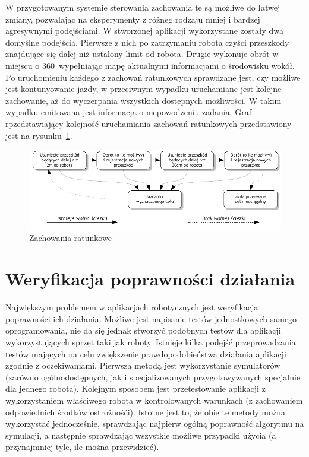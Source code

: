 W przygotowanym systemie sterowania zachowania te są możliwe do łatwej zmiany, pozwalając
na eksperymenty z różneg rodzaju mniej i bardzej agresywnymi podejściami. W stworzonej
aplikacji wykorzystane zostały dwa domyślne podejścia. Pierwsze z nich po zatrzymaniu
robota czyści przeszkody znajdujące się dalej niż ustalony limit od robota. Drugie
wykonuje obrót w miejscu o 360\textdegree~wypełniając mapę aktualnymi informacjami
o środowisku wokół. Po uruchomieniu każdego z zachowań ratunkowych sprawdzane jest,
czy możliwe jest kontunyowanie jazdy, w przeciwnym wypadku uruchamiane jest kolejne
zachowanie, aż do wyczerpania wszystkich dostepnych możliwości. W takim wypadku
emitowana jest informacja o niepowodzeniu zadania. Graf rpzedstawiający kolejność
uruchamiania zachowań ratunkowych przedstawiony jest na rysunku~\ref{fig:recovery}.

\begin{figure}[h!]
\centering
\includegraphics[width=\textwidth]{../img/recovery}
\caption{Zachowania ratunkowe}
\label{fig:recovery}
\end{figure}

\section{Weryfikacja poprawności działania}

Największym problemem w aplikacjach robotycznych jest weryfikacja poprawności ich
działania. Możliwe jest napisanie testów jednostkowych samego oprogramowania,
nie da się jednak stworzyć podobnych testów dla aplikacji wykorzystujących sprzęt
taki jak roboty. Istnieje kilka podejść przeprowadzania testów mających na celu
zwiększenie prawdopodobieństwa działania aplikacji zgodnie z oczekiwaniami.
Pierwszą metodą jest wykorzystanie symulatorów (zarówno ogólnodostępnych, jak
i specjalizowanych przygotowywanych specjalnie dla jednego robota). Kolejnym sposobem
jest przetestowanie aplikacji z wykorzystaniem właściwego robota w kontrolowanych
warunkach (z zachowaniem odpowiednich środków ostrożnośći). Istotne jest to, że
obie te metody można wykorzystać jednocześnie, sprawdzając najpierw ogólną poprawność
algorytmu na symulacji, a następnie sprawdzając wszystkie możliwe przypadki użycia
(a przynajmniej tyle, ile można przewidzieć).

